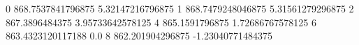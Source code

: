 0 868.7537841796875 5.32147216796875
1 868.7479248046875 5.31561279296875
2 867.3896484375 3.95733642578125
4 865.1591796875 1.72686767578125
6 863.4323120117188 0.0
8 862.201904296875 -1.23040771484375
